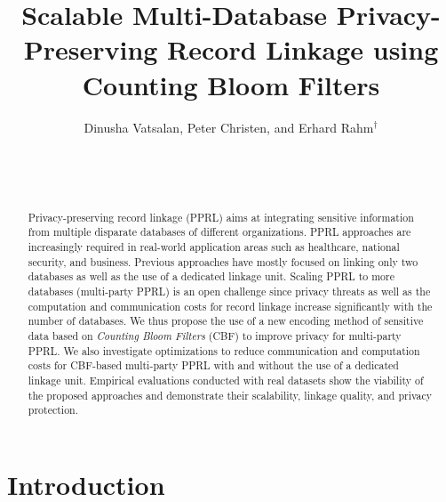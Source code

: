 \documentclass{sig-alternate}
\begin{document}
\title{Scalable Multi-Database Privacy-Preserving Record Linkage using Counting Bloom Filters}

\author{
\alignauthor Dinusha Vatsalan, Peter Christen, and Erhard Rahm$^\dag$ \\
       \\
       \\
       \\
}

\maketitle
\begin{abstract}
Privacy-preserving record linkage (PPRL) aims at integrating sensitive information from multiple disparate databases of different organizations. PPRL approaches are increasingly required in real-world application areas such as healthcare, national security, and business. Previous approaches have mostly focused on linking only two databases as well as the use of a dedicated linkage unit. Scaling PPRL to more databases (multi-party PPRL) is an open challenge since privacy threats as well as the computation and communication costs for record linkage increase significantly with the number of databases. We thus propose the use of a new encoding method of sensitive data based on \emph{Counting Bloom Filters} (CBF) to improve privacy for multi-party PPRL. We also investigate optimizations to reduce communication and computation costs for CBF-based multi-party PPRL with and without the use of a dedicated linkage unit. Empirical evaluations conducted with real datasets show the viability of the proposed approaches and demonstrate their scalability, linkage quality, and privacy protection.

\end{abstract}



\section{Introduction}
\label{sec:intro}
\end{document}

